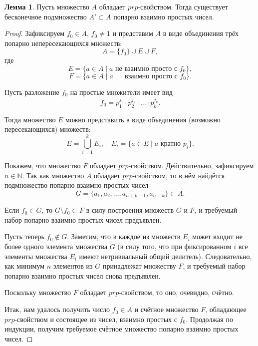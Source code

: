 \documentclass[a4paper,openbib]{article}
\theoremstyle{definition}
\newtheorem{lemma}{Лемма}[section]
\begin{document}
\begin{lemma}
	\label{lem:ac0_primes_infinity_mutually_prime_subset_equiv_to_prp_property}
	Пусть множество $A$ обладает $prp$-свойством.
	Тогда существует бесконечное подмножество $A'\subset A$ попарно взаимно простых чисел.
\end{lemma}
\begin{proof}
	Зафиксируем $f_0\in A$, $f_0 \neq 1$ и представим $A$ в виде объединения трёх попарно непересекающихся множеств:
	\begin{equation}
		A = \{f_0\} \cup E \cup F
		,
	\end{equation}
	где
	\begin{equation}
		E = \{ a \in A \mid a \mbox{~не взаимно просто с~} f_0 \}
		,
	\end{equation}
	\begin{equation}
		F = \{ a \in A \mid a \mbox{ ~~~~взаимно просто с~} f_0 \}
		.
	\end{equation}
	
	Пусть разложение $f_0$ на простые множители имеет вид
	\begin{equation}
		f_0 = p_1^{j_1} \cdot p_2^{j_2} \cdot ... \cdot p_k^{j_k}
		.
	\end{equation}

	Тогда множество $E$ можно представить в виде объединения (возможно пересекающихся) множеств:
	\begin{equation}
		E = \bigcup_{i=1}^{k} E_i,\quad E_i = \{a\in E \mid a \mbox{~кратно~} p_i\}
		.
	\end{equation}
	
	Покажем, что множество $F$ обладает $prp$-свойством.
	Действительно, зафиксируем $n\in\mathbb{N}$.
	Так как множество $A$ обладает $prp$-свойством,
	то в нём найдётся подмножество попарно взаимно простых чисел
	$$G=\{a_1, a_2, ..., a_{n+k-1}, a_{n+k}\}\subset A.$$
	
	Если $f_0\in G$, то $G\setminus f_0 \subset F$ в силу построения множеств $G$ и $F$, и требуемый набор попарно взаимно простых чисел предъявлен.
	
	Пусть теперь $f_0\notin G$.
	Заметим, что в каждое из множеств $E_i$ может входит не более одного элемента множества $G$
	(в силу того, что при фиксированном $i$ все элементы множества $E_i$ имеют нетривиальный общий делитель).
	Следовательно, как минимум $n$ элементов из $G$ принадлежат множеству $F$,
	и требуемый набор попарно взаимно простых чисел снова предъявлен.
	
	Поскольку множество $F$ обладает $prp$-свойством, то оно, очевидно, счётно.
	
	Итак, нам удалось получить число $f_0\in A$ и счётное множество $F$, обладающее $prp$-свойством
	и состоящее из чисел, взаимно простых с $f_0$.
	Продолжая по индукции, получим требуемое счётное множество попарно взаимно простых чисел. 
\end{proof}
\end{document}

